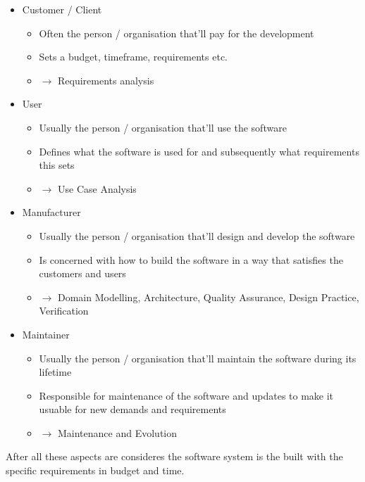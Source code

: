 \documentclass[
../../Software_Engineering_Summary.tex,
]
{subfiles}
\begin{document}
\begin{greenbox*}
    \begin{itemize}
        \item Customer / Client
        \begin{itemize}
            \item Often the person / organisation that'll pay for the development
            \item Sets a budget, timeframe, requirements etc.
            \item $\rightarrow$ Requirements analysis
        \end{itemize}
        \item User
        \begin{itemize}
            \item Usually the person / organisation that'll use the software
            \item Defines what the software is used for and subsequently what requirements this sets
            \item $\rightarrow$ Use Case Analysis
        \end{itemize}
        \item Manufacturer
        \begin{itemize}
            \item Usually the person / organisation that'll design and develop the software
            \item Is concerned with how to build the software in a way that satisfies the customers and users
            \item $\rightarrow$ Domain Modelling, Architecture, Quality Assurance, Design Practice, Verification
        \end{itemize}
        \item Maintainer
        \begin{itemize}
            \item Usually the person / organisation that'll maintain the software during its lifetime
            \item Responsible for maintenance of the software and updates to make it usuable for new demands and requirements
            \item $\rightarrow$ Maintenance and Evolution
        \end{itemize}
    \end{itemize}
\end{greenbox*}
After all these aspects are consideres the software system is the built with the specific requirements in budget and time.
\end{document}
